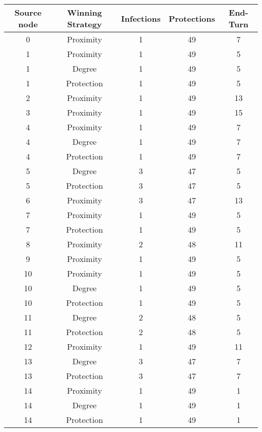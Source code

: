 \documentclass[results.tex]{subfiles}
\begin{document}
\begin{center}
  \begin{tabular}{| c || c | c | c | c |}
    \hline
    {\bfseries Source node} & {\bfseries Winning Strategy} & {\bfseries Infections} & {\bfseries Protections} & {\bfseries End-Turn} \\  %
    \hline\hline
    0 & Proximity & 1 & 49 & 7 \\ 
    \hline
    1 & Proximity & 1 & 49 & 5 \\ 
    \hline
    1 & Degree & 1 & 49 & 5 \\ 
    \hline
    1 & Protection & 1 & 49 & 5 \\ 
    \hline
    2 & Proximity & 1 & 49 & 13 \\ 
    \hline
    3 & Proximity & 1 & 49 & 15 \\ 
    \hline
    4 & Proximity & 1 & 49 & 7 \\ 
    \hline
    4 & Degree & 1 & 49 & 7 \\ 
    \hline
    4 & Protection & 1 & 49 & 7 \\ 
    \hline
    5 & Degree & 3 & 47 & 5 \\ 
    \hline
    5 & Protection & 3 & 47 & 5 \\ 
    \hline
    6 & Proximity & 3 & 47 & 13 \\ 
    \hline
    7 & Proximity & 1 & 49 & 5 \\ 
    \hline
    7 & Protection & 1 & 49 & 5 \\ 
    \hline
    8 & Proximity & 2 & 48 & 11 \\ 
    \hline
    9 & Proximity & 1 & 49 & 5 \\ 
    \hline
    10 & Proximity & 1 & 49 & 5 \\ 
    \hline
    10 & Degree & 1 & 49 & 5 \\ 
    \hline
    10 & Protection & 1 & 49 & 5 \\ 
    \hline
    11 & Degree & 2 & 48 & 5 \\ 
    \hline
    11 & Protection & 2 & 48 & 5 \\ 
    \hline
    12 & Proximity & 1 & 49 & 11 \\ 
    \hline
    13 & Degree & 3 & 47 & 7 \\ 
    \hline
    13 & Protection & 3 & 47 & 7 \\ 
    \hline
    14 & Proximity & 1 & 49 & 1 \\ 
    \hline
    14 & Degree & 1 & 49 & 1 \\ 
    \hline
    14 & Protection & 1 & 49 & 1 \\ 

\end{tabular}
\end{center}
\end{document}

